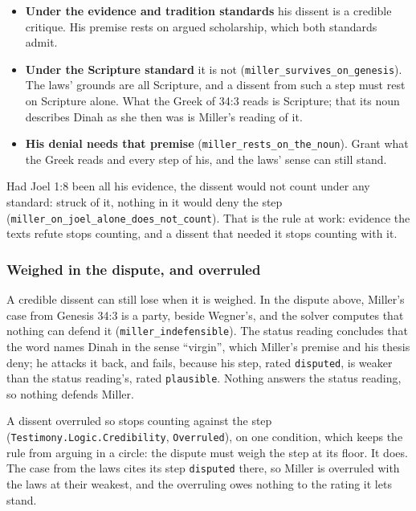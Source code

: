 \documentclass[11pt]{article}
\begin{document}
\begin{itemize}
  \item \textbf{Under the evidence and tradition standards} his dissent is a credible critique. His premise rests on argued scholarship, which both standards admit.
  \item \textbf{Under the Scripture standard} it is not (\texttt{miller\_\allowbreak{}survives\_\allowbreak{}on\_\allowbreak{}genesis}). The laws’ grounds are all Scripture, and a dissent from such a step must rest on Scripture alone. What the Greek of 34:3 reads is Scripture; that its noun describes Dinah as she then was is Miller’s reading of it.
  \item \textbf{His denial needs that premise} (\texttt{miller\_\allowbreak{}rests\_\allowbreak{}on\_\allowbreak{}the\_\allowbreak{}noun}). Grant what the Greek reads and every step of his, and the laws’ sense can still stand.
\end{itemize}
Had Joel 1:8 been all his evidence, the dissent would not count under any standard: struck of it, nothing in it would deny the step (\texttt{miller\_\allowbreak{}on\_\allowbreak{}joel\_\allowbreak{}alone\_\allowbreak{}does\_\allowbreak{}not\_\allowbreak{}count}). That is the rule at work: evidence the texts refute stops counting, and a dissent that needed it stops counting with it.

\subsubsection*{Weighed in the dispute, and overruled}
A credible dissent can still lose when it is weighed. In the dispute above, Miller’s case from Genesis 34:3 is a party, beside Wegner’s, and the solver computes that nothing can defend it (\texttt{miller\_\allowbreak{}indefensible}). The status reading concludes that the word names Dinah in the sense “virgin”, which Miller’s premise and his thesis deny; he attacks it back, and fails, because his step, rated \texttt{disputed}, is weaker than the status reading’s, rated \texttt{plausible}. Nothing answers the status reading, so nothing defends Miller.

A dissent overruled so stops counting against the step (\texttt{Testimony.Logic.Credibility}, \texttt{Overruled}), on one condition, which keeps the rule from arguing in a circle: the dispute must weigh the step at its floor. It does. The case from the laws cites its step \texttt{disputed} there, so Miller is overruled with the laws at their weakest, and the overruling owes nothing to the rating it lets stand.
\end{document}
